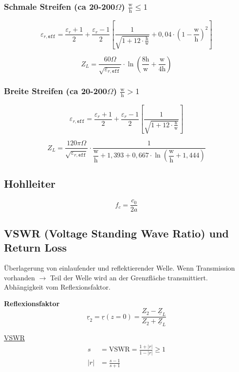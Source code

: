 \subsubsection[Schmale Streifen]{Schmale Streifen (ca 20-200$\Omega$) $\frac{\mathrm{w}}{\mathrm{h}}\leq 1$}
\[
	\varepsilon_{r,\texttt{eff}}  = \frac{\varepsilon_r+1}{2} + \frac{\varepsilon_r-1}{2}
  \left[\frac{1}{\sqrt{1+12\cdot\frac{\mathrm{h}}{\mathrm{w}}}} +
  0,04\cdot\left(1-\frac{\mathrm{w}}{\mathrm{h}}\right)^2\right]
\]

\[
	Z_L = \frac{60\Omega}{\sqrt{\varepsilon_{r,\texttt{eff}}}}\cdot\ln\left(\frac{8\mathrm{h}}{\mathrm{w}}+\frac{\mathrm{w}}{4\mathrm{h}}\right)
\]

\subsubsection[Breite Streifen]{Breite Streifen (ca 20-200$\Omega$) $\frac{\mathrm{w}}{\mathrm{h}} > 1$}
\[
	\varepsilon_{r,\texttt{eff}}  = \frac{\varepsilon_r+1}{2} + \frac{\varepsilon_r-1}{2}
  \left[\frac{1}{\sqrt{1+12\cdot\frac{\mathrm{h}}{\mathrm{w}}}}\right]
\]

\[
	Z_L = \frac{120\pi\Omega}{\sqrt{\varepsilon_{r,\texttt{eff}}}}\cdot\frac{1}{\dfrac{\mathrm{w}}{\mathrm{h}}+1,393+0,667\cdot\ln\left(\dfrac{\mathrm{w}}{\mathrm{h}}+1,444\right)}
\]

\subsection{Hohlleiter}
\[
	f_c = \frac{c_0}{2a}
\]

\subsection{VSWR (Voltage Standing Wave Ratio) und Return Loss}\label{sec:VSWR}

Überlagerung von einlaufender und reflektierender Welle. Wenn Transmission
vorhanden $\rightarrow$ Teil der Welle wird an der Grenzfläche transmittiert.
Abhängigkeit vom Reflexionsfaktor.

\textbf{Reflexionsfaktor}
\[
	\underline{r}_2 = \underline{r}(z=0) = \frac{Z_2 - \underline{Z}_L}{Z_2 + \underline{Z}_L}
\]

\underline{VSWR}
\begin{align*}
	s   & = \mathrm{VSWR} = \frac{1+|r|}{1-|r|}\geq 1 \\
	|r| & = \frac{s-1}{s+1}
\end{align*}

